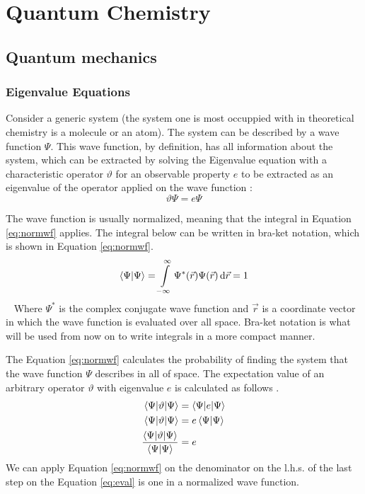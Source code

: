 \documentclass[../master_thesis.tex]{subfiles}
\begin{document}
\chapter{Quantum Chemistry}
\section{Quantum mechanics}
\subsection{Eigenvalue Equations}
Consider a generic system (the system one is most occuppied with in theoretical
chemistry is a molecule or an atom). The system can be described by a
wave function $\Psi$. This wave function, by definition, has all information
about the system, which can be extracted by solving the Eigenvalue equation
with a characteristic operator $\vartheta$ for an observable property $ e $ to
be extracted as an eigenvalue of the operator applied on the wave function
\cite{Cramer:2004}:
\begin{equation}
  \vartheta\Psi = e\Psi\label{eq:eigenequation}
\end{equation}

The wave function is usually normalized, meaning that the integral in Equation
\ref{eq:normwf} applies. The integral below can be written in bra-ket
\cite{Jensen:2017} notation, which is shown in Equation \ref{eq:normwf}.
\begin{equation}
  \braket{\Psi|\Psi} = \int\limits_{-\infty}^{\infty}
  \Psi^*(\vec{r})\Psi(\vec{r})\mathrm{\,d}\vec{r} = 1\label{eq:normwf}
\end{equation} 
Where $\Psi^*$ is the complex conjugate wave function and $\vec{r}$ is a
coordinate vector in which the wave function is evaluated over all space.
Bra-ket notation is what will be used from now on to write integrals in a more
compact manner.

The Equation \ref{eq:normwf} calculates the probability of finding the system
that the wave function $\Psi$ describes in all of space. The expectation value
of an arbitrary operator $\vartheta$ with eigenvalue $e$ is calculated as
follows \cite{Atkins:2014}.
\begin{align}
  \begin{split}
    \braket{\Psi|\vartheta|\Psi} &= \braket{\Psi|e|\Psi} \\
    \braket{\Psi|\vartheta|\Psi}&= e\braket{\Psi|\Psi} \\
    \frac{\braket{\Psi|\vartheta|\Psi}}{\braket{\Psi|\Psi}}&= e\label{eq:eval}
  \end{split}
\end{align}
We can apply Equation \ref{eq:normwf} on the denominator on the l.h.s. of the
last step on the Equation \ref{eq:eval} is one in a normalized wave function.
\end{document}
